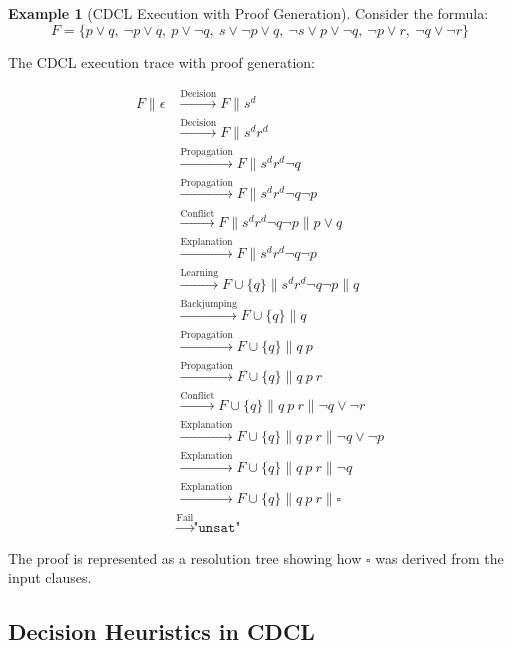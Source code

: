 \documentclass[11pt,a4paper]{article}
\theoremstyle{definition}
\newtheorem{example}{Example}[section]
\theoremstyle{plain}
\theoremstyle{remark}
\begin{document}
\begin{example}[CDCL Execution with Proof Generation]
Consider the formula:
\[
F = \{ p \lor q,\ \neg p \lor q,\ p \lor \neg q,\ s \lor \neg p \lor q,\ \neg s \lor p \lor \neg q,\ \neg p \lor r,\ \neg q \lor \neg r \}
\]

The CDCL execution trace with proof generation:

\begin{align*}
F \parallel \epsilon &\xrightarrow{\text{Decision}} F \parallel s^d \\
&\xrightarrow{\text{Decision}} F \parallel s^d r^d \\
&\xrightarrow{\text{Propagation}} F \parallel s^d r^d \neg q \\
&\xrightarrow{\text{Propagation}} F \parallel s^d r^d \neg q \neg p \\
&\xrightarrow{\text{Conflict}} F \parallel s^d r^d \neg q \neg p \parallel p \lor q \\
&\xrightarrow{\text{Explanation}} F \parallel s^d r^d \neg q \neg p \\
&\xrightarrow{\text{Learning}} F \cup \{q\} \parallel s^d r^d \neg q \neg p \parallel q \\
&\xrightarrow{\text{Backjumping}} F \cup \{q\} \parallel q \\
&\xrightarrow{\text{Propagation}} F \cup \{q\} \parallel q\ p \\
&\xrightarrow{\text{Propagation}} F \cup \{q\} \parallel q\ p\ r \\
&\xrightarrow{\text{Conflict}} F \cup \{q\} \parallel q\ p\ r \parallel \neg q \lor \neg r \\
&\xrightarrow{\text{Explanation}} F \cup \{q\} \parallel q\ p\ r \parallel \neg q \lor \neg p \\
&\xrightarrow{\text{Explanation}} F \cup \{q\} \parallel q\ p\ r \parallel \neg q \\
&\xrightarrow{\text{Explanation}} F \cup \{q\} \parallel q\ p\ r \parallel \square \\
&\xrightarrow{\text{Fail}} \texttt{"unsat"}
\end{align*}

The proof is represented as a resolution tree showing how $\square$ was derived from the input clauses.
\end{example}

\newpage

\subsection{Decision Heuristics in CDCL}
\end{document}
